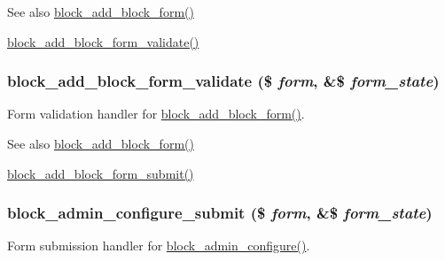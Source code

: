 \begin{DoxySeeAlso}{See also}
\hyperlink{group__forms_ga974d0d9820f12e9a2ce5ae328d0ccdc5}{block\_\-add\_\-block\_\-form()} 

\hyperlink{block_8admin_8inc_a01e910bd6f2a2cab75dde1db2df7af9b}{block\_\-add\_\-block\_\-form\_\-validate()} 
\end{DoxySeeAlso}
\hypertarget{block_8admin_8inc_a01e910bd6f2a2cab75dde1db2df7af9b}{
\subsubsection[{block\_\-add\_\-block\_\-form\_\-validate}]{\setlength{\rightskip}{0pt plus 5cm}block\_\-add\_\-block\_\-form\_\-validate (\$ {\em form}, \/  \&\$ {\em form\_\-state})}}
\label{block_8admin_8inc_a01e910bd6f2a2cab75dde1db2df7af9b}
Form validation handler for \hyperlink{group__forms_ga974d0d9820f12e9a2ce5ae328d0ccdc5}{block\_\-add\_\-block\_\-form()}.

\begin{DoxySeeAlso}{See also}
\hyperlink{group__forms_ga974d0d9820f12e9a2ce5ae328d0ccdc5}{block\_\-add\_\-block\_\-form()} 

\hyperlink{block_8admin_8inc_ab1b62b97e79a16ab5a83cc746429601d}{block\_\-add\_\-block\_\-form\_\-submit()} 
\end{DoxySeeAlso}
\hypertarget{block_8admin_8inc_a5f23480eb6a76d82ab516f09baaa2318}{
\subsubsection[{block\_\-admin\_\-configure\_\-submit}]{\setlength{\rightskip}{0pt plus 5cm}block\_\-admin\_\-configure\_\-submit (\$ {\em form}, \/  \&\$ {\em form\_\-state})}}
\label{block_8admin_8inc_a5f23480eb6a76d82ab516f09baaa2318}
Form submission handler for \hyperlink{group__forms_ga0efaf6e043d69e3fe4f596341f6f90e2}{block\_\-admin\_\-configure()}.


